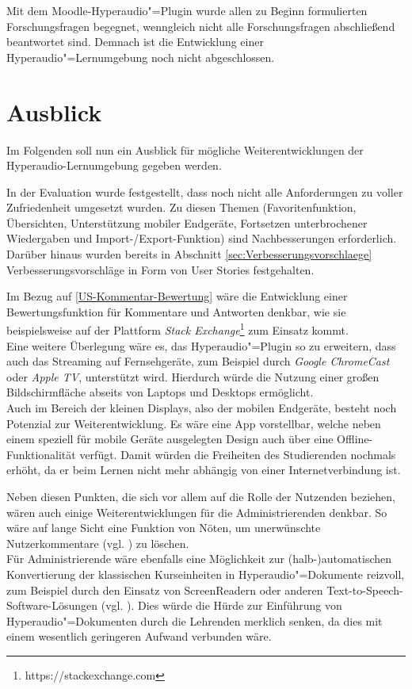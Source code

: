 Mit dem Moodle-Hyperaudio"=Plugin wurde allen zu Beginn formulierten Forschungsfragen begegnet, wenngleich nicht alle Forschungsfragen abschließend beantwortet sind. Demnach ist die Entwicklung einer Hyperaudio"=Lernumgebung noch nicht abgeschlossen.
%

\section{Ausblick}

Im Folgenden soll nun ein Ausblick für mögliche Weiterentwicklungen der Hyperaudio-Lernumgebung gegeben werden.

In der Evaluation wurde festgestellt, dass noch nicht alle Anforderungen zu voller Zufriedenheit umgesetzt wurden. Zu diesen Themen (Favoritenfunktion, Übersichten, Unterstützung mobiler Endgeräte, Fortsetzen unterbrochener Wiedergaben und Import-/Export-Funktion) sind Nachbesserungen erforderlich. Darüber hinaus wurden bereits in Abschnitt \ref{sec:Verbesserungsvorschlaege} Verbesserungsvorschläge in Form von User Stories festgehalten.

Im Bezug auf \ref{US-Kommentar-Bewertung} wäre die Entwicklung einer Bewertungsfunktion für Kommentare und Antworten denkbar, wie sie beispielsweise auf der Plattform \textit{Stack Exchange}\footnote{https://stackexchange.com} zum Einsatz kommt.\\
Eine weitere Überlegung wäre es, das Hyperaudio"=Plugin so zu erweitern, dass auch das Streaming auf Fernsehgeräte, zum Beispiel durch \textit{Google ChromeCast} oder \textit{Apple TV}, unterstützt wird. Hierdurch würde die Nutzung einer großen Bildschirmfläche abseits von Laptops und Desktops ermöglicht.\\
Auch im Bereich der kleinen Displays, also der mobilen Endgeräte, besteht noch Potenzial zur Weiterentwicklung. Es wäre eine App vorstellbar, welche neben einem speziell für mobile Geräte ausgelegten Design auch über eine Offline-Funktionalität verfügt. Damit würden die Freiheiten des Studierenden nochmals erhöht, da er beim Lernen nicht mehr abhängig von einer Internetverbindung ist.

Neben diesen Punkten, die sich vor allem auf die Rolle der Nutzenden beziehen, wären auch einige Weiterentwicklungen für die Administrierenden denkbar. So wäre auf lange Sicht eine Funktion von Nöten, um unerwünschte Nutzerkommentare (vgl. \cite{reinmann2002analyse}) zu löschen.\\
Für Administrierende wäre ebenfalls eine Möglichkeit zur (halb-)automatischen Konvertierung der klassischen Kurseinheiten in Hyperaudio"=Dokumente reizvoll, zum Beispiel durch den Einsatz von ScreenReadern oder anderen Text-to-Speech-Software-Lösungen (vgl. \cite{donker2007gestaltung}). Dies würde die Hürde zur Einführung von Hyperaudio"=Dokumenten durch die Lehrenden merklich senken, da dies mit einem wesentlich geringeren Aufwand verbunden wäre.


